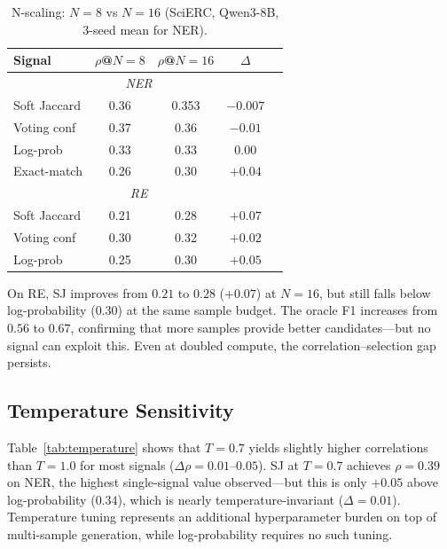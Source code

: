 \documentclass[11pt,a4paper]{article}
\begin{document}
\begin{table}[t]
\centering
\small
\caption{N-scaling: $N=8$ vs $N=16$ (SciERC, Qwen3-8B, 3-seed mean for NER).}
\label{tab:nscaling}
\begin{tabular}{lcccc}
\toprule
Signal & $\rho$@$N{=}8$ & $\rho$@$N{=}16$ & $\Delta$ \\
\midrule
\multicolumn{4}{c}{\textit{NER}} \\
\midrule
Soft Jaccard & 0.36 & 0.353 & $-0.007$ \\
Voting conf & 0.37 & 0.36 & $-0.01$ \\
Log-prob & 0.33 & 0.33 & $0.00$ \\
Exact-match & 0.26 & 0.30 & $+0.04$ \\
\midrule
\multicolumn{4}{c}{\textit{RE}} \\
\midrule
Soft Jaccard & 0.21 & 0.28 & $+0.07$ \\
Voting conf & 0.30 & 0.32 & $+0.02$ \\
Log-prob & 0.25 & 0.30 & $+0.05$ \\
\bottomrule
\end{tabular}
\end{table}

On RE, SJ improves from $0.21$ to $0.28$ ($+0.07$) at $N=16$, but still falls below log-probability ($0.30$) at the same sample budget. The oracle F1 increases from $0.56$ to $0.67$, confirming that more samples provide better candidates---but no signal can exploit this. Even at doubled compute, the correlation--selection gap persists.

\subsection{Temperature Sensitivity}
\label{sec:temperature}

Table~\ref{tab:temperature} shows that $T=0.7$ yields slightly higher correlations than $T=1.0$ for most signals ($\Delta\rho = 0.01$--$0.05$). SJ at $T=0.7$ achieves $\rho = 0.39$ on NER, the highest single-signal value observed---but this is only $+0.05$ above log-probability ($0.34$), which is nearly temperature-invariant ($\Delta = 0.01$). Temperature tuning represents an additional hyperparameter burden on top of multi-sample generation, while log-probability requires no such tuning.
\end{document}
